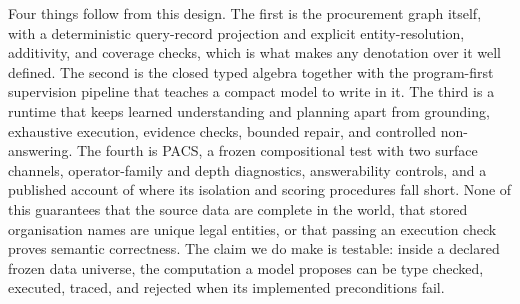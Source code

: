 Four things follow from this design.  The first is the procurement graph itself, with a
deterministic query-record projection and explicit entity-resolution, additivity, and coverage
checks, which is what makes any denotation over it well defined.  The second is the closed typed
algebra together with the program-first supervision pipeline that teaches a compact model to
write in it.  The third is a runtime that keeps learned understanding and planning apart from
grounding, exhaustive execution, evidence checks, bounded repair, and controlled non-answering.
The fourth is PACS, a frozen compositional test with two surface channels, operator-family and
depth diagnostics, answerability controls, and a published account of where its isolation and
scoring procedures fall short.  None of this guarantees that the source data are complete in the
world, that stored organisation names are unique legal entities, or that passing an execution
check proves semantic correctness.  The claim we do make is testable: inside a declared frozen
data universe, the computation a model proposes can be type checked, executed, traced, and
rejected when its implemented preconditions fail.
